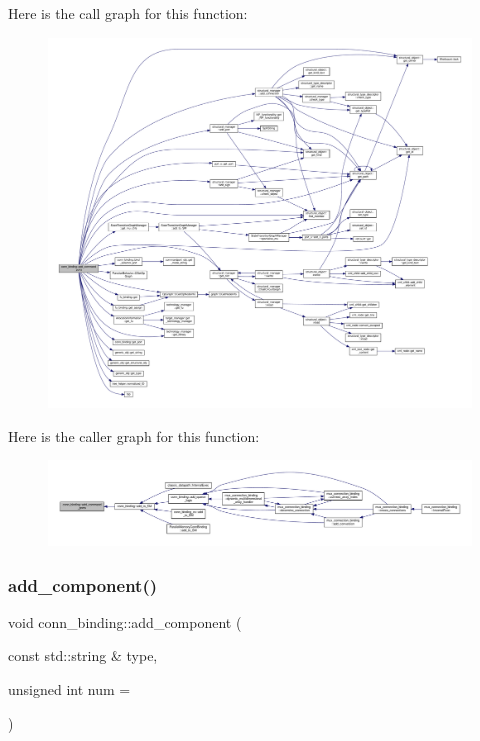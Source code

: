 Here is the call graph for this function\+:
\nopagebreak
\begin{figure}[H]
\begin{center}
\leavevmode
\includegraphics[width=350pt]{d2/db1/classconn__binding_abad9d4010da617d55dd3ba1a1eaf3bf1_cgraph}
\end{center}
\end{figure}
Here is the caller graph for this function\+:
\nopagebreak
\begin{figure}[H]
\begin{center}
\leavevmode
\includegraphics[width=350pt]{d2/db1/classconn__binding_abad9d4010da617d55dd3ba1a1eaf3bf1_icgraph}
\end{center}
\end{figure}
\mbox{\label{classconn__binding_a0d6764ed3f41fa21e131a4a5c3a84978}} 
\subsubsection{\texorpdfstring{add\+\_\+component()}{add\_component()}}
{\footnotesize\ttfamily void conn\+\_\+binding\+::add\+\_\+component (\begin{DoxyParamCaption}\item[{const std\+::string \&}]{type,  }\item[{unsigned int}]{num = {} }\end{DoxyParamCaption})}



